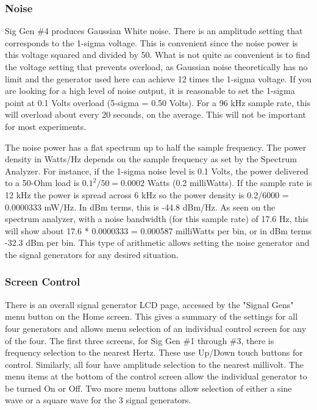 \subsubsection{Noise}
Sig Gen \#4 produces Gaussian White noise.  There is an amplitude setting that corresponds to the 1-sigma voltage.  This is convenient since the noise power is this voltage squared and divided by 50.  What is not quite as convenient is to find the voltage setting that prevents overload, as Gaussian noise theoretically has no limit and the generator used here can achieve 12 times the 1-sigma voltage.  If you are looking for a high level of noise output, it is reasonable to set the 1-sigma point at 0.1 Volts overload (5-sigma = 0.50 Volts). For a 96 kHz sample rate, this will overload about every 20 seconds, on the average.  This will not be important for most experiments.

The noise power has a flat spectrum up to half the sample frequency.  The power density in Watts/Hz depends on the sample frequency as set by the Spectrum Analyzer.  For instance, if the 1-sigma noise level is 0.1 Volts, the power delivered to a 50-Ohm load is $0.1^2/50 = 0.0002$ Watts (0.2 milliWatts).   If the sample rate is 12 kHz the power is spread across 6 kHz so the power density is 0.2/6000 = 0.0000333 mW/Hz.  In dBm terms, this is -44.8 dBm/Hz.  As seen on the spectrum analyzer, with a noise bandwidth (for this sample rate) of 17.6 Hz, this will show about 17.6 * 0.0000333 = 0.000587 milliWatts per bin, or in dBm terms -32.3 dBm per bin.   This type of arithmetic allows setting the noise generator and the signal generators for any desired situation.

\subsubsection{Screen Control}
There is an overall signal generator LCD page, accessed by the "Signal Gens" menu button on the Home screen.  This gives a summary of the settings for all four generators and allows menu selection of an individual control screen for any of the four.  The first three screens, for Sig Gen \#1 through \#3, there is frequency selection to the nearest Hertz.  These use Up/Down touch buttons for control.  Similarly, all four have amplitude selection to the nearest millivolt.  The menu items at the bottom of the control screen allow the individual generator to be turned On or Off.  Two more  menu buttons allow selection of either a sine wave or a square wave for the 3 signal generators.

